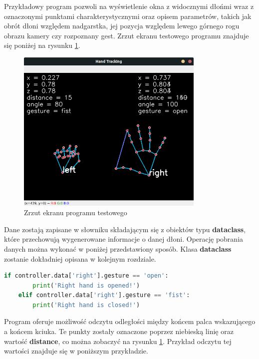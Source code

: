 \quad Przykładowy program pozwoli na wyświetlenie okna z widocznymi dłońmi wraz z oznaczonymi punktami charakterystycznymi oraz opisem parametrów, takich jak obrót dłoni względem nadgarstka, jej pozycja względem lewego górnego rogu obrazu kamery czy rozpoznany gest. Zrzut ekranu testowego programu znajduje się poniżej na rysunku \ref{fig:prog_screen_1}. 

\begin{figure}[H]
    \begin{center}
        \includegraphics[width=9cm]{../images/example_program.png}
        \caption{Zrzut ekranu programu testowego}
        \label{fig:prog_screen_1}
    \end{center}
\end{figure}

\quad Dane zostają zapisane w słowniku składającym się z obiektów typu \textbf{dataclass}, które przechowują wygenerowane informacje o danej dłoni. Operację pobrania danych można wykonać w poniżej przedstawiony sposób. Klasa \textbf{dataclass} zostanie dokładniej opisana w kolejnym rozdziale.

\begin{lstlisting}[language=python, style=programming, caption={Odczyt gestów}]
    if controller.data['right'].gesture == 'open':
        print('Right hand is opened!')
    elif controller.data['right'].gesture == 'fist':
        print('Right hand is closed!')
\end{lstlisting}

\quad Program oferuje możliwość odczytu odległości między końcem palca wskazującego a końcem kciuka. Te punkty zostały oznaczone poprzez niebieską linię oraz wartość \textbf{distance}, co można zobaczyć na rysunku \ref{fig:prog_screen_1}. Przykład odczytu tej wartości znajduje się w poniższym przykładzie. 

